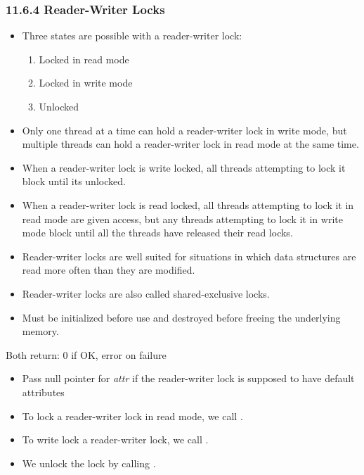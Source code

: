\documentclass[]{article}
\begin{document}
\subsubsection*{11.6.4 Reader-Writer Locks}
\begin{itemize}
\item Three states are possible with a reader-writer lock:
\begin{enumerate}
\item Locked in read mode
\item Locked in write mode
\item Unlocked
\end{enumerate}
\item Only one thread at a time can hold a reader-writer lock in write mode, but
multiple threads can hold a reader-writer lock in read mode at the same time.
\item When a reader-writer lock is write locked, all threads attempting to lock
it block until its unlocked.
\item When a reader-writer lock is read locked, all threads attempting to lock
it in read mode are given access, but any threads attempting to lock it in write
mode block until all the threads have released their read locks.
\item Reader-writer locks are well suited for situations in which data
structures are read more often than they are modified.
\item Reader-writer locks are also called shared-exclusive locks.
\item Must be initialized before use and destroyed before freeing the underlying
memory.
\end{itemize}




Both return: 0 if OK, error on failure

\begin{itemize}
\item Pass null pointer for \emph{attr} if the reader-writer lock is supposed to
have default attributes
\item To lock a reader-writer lock in read mode, we call
.
\item To write lock a reader-writer lock, we call
.
\item We unlock the lock by calling .
\end{itemize}
\end{document}
